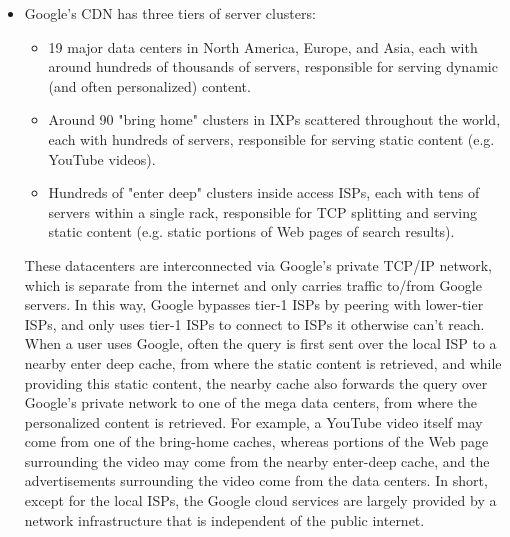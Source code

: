 \documentclass[table, xcdraw]{article}%
\begin{document}
\begin{itemize}
    \item Google's CDN has three tiers of server clusters:
    \begin{itemize}
        \item 19 major data centers in North America, Europe, and Asia, each with around hundreds of thousands of servers, responsible for serving dynamic (and often personalized) content.
        \item Around 90 "bring home" clusters in IXPs scattered throughout the world, each with hundreds of servers, responsible for serving static content (e.g. YouTube videos).
        \item Hundreds of "enter deep" clusters inside access ISPs, each with tens of servers within a single rack, responsible for TCP splitting and serving static content (e.g. static portions of Web pages of search results).
    \end{itemize}
    
    These datacenters are interconnected via Google’s private TCP/IP network, which is separate from the internet and only carries traffic to/from Google servers. In this way, Google bypasses tier-1 ISPs by peering with lower-tier ISPs, and only uses tier-1 ISPs to connect to ISPs it otherwise can't reach.\\
    When a user uses Google, often the query is first sent over the local ISP to a nearby enter deep cache, from where the static content is retrieved, and while providing this static content, the nearby cache also forwards the query over Google’s private network to one of the mega data centers, from where the personalized content is retrieved. For example, a YouTube video itself may come from one of the bring-home caches, whereas portions of the Web page surrounding the video may come from the nearby enter-deep cache, and the advertisements surrounding the video come from the data centers. In short, except for the local ISPs, the Google cloud services are largely provided by a network infrastructure that is independent of the public internet.
    

\end{itemize}
\end{document}
